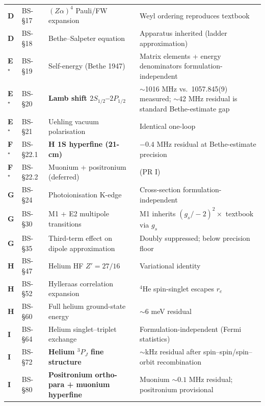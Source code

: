 \begin{center}
\begin{longtable}{lllp{5.5cm}}
\textbf{D} & BS-\S 17  & $(Z\alpha)^4$ Pauli/FW expansion           & Weyl ordering reproduces textbook \\
\textbf{D} & BS-\S 18  & Bethe--Salpeter equation                   & Apparatus inherited (ladder approximation) \\
\textbf{E}$^\star$ & BS-\S 19   & Self-energy (Bethe 1947)          & Matrix elements + energy denominators formulation-independent \\
\textbf{E}$^\star$ & BS-\S 20   & \textbf{Lamb shift $2S_{1/2}$--$2P_{1/2}$} & $\sim$1016 MHz vs.~1057.845(9) measured; $\sim$42 MHz residual is standard Bethe-estimate gap \\
\textbf{E}$^\star$ & BS-\S 21   & Uehling vacuum polarisation       & Identical one-loop \\
\textbf{F}$^\star$ & BS-\S 22.1 & \textbf{H 1S hyperfine (21-cm)}   & ${-}0.4$ MHz residual at Bethe-estimate precision \\
\textbf{F}$^\star$ & BS-\S 22.2 & Muonium + positronium (deferred)  & (PR I) \\
\textbf{G} & BS-\S 24  & Photoionisation K-edge                     & Cross-section formulation-independent \\
\textbf{G} & BS-\S 30  & M1 + E2 multipole transitions              & M1 inherits $(g_s/{-}2)^2 \times$ textbook via $g_s$ \\
\textbf{G} & BS-\S 35  & Third-term effect on dipole approximation  & Doubly suppressed; below precision floor \\
\textbf{H} & BS-\S 47  & Helium HF $Z' = 27/16$                     & Variational identity \\
\textbf{H} & BS-\S 52  & Hylleraas correlation expansion            & ${}^4$He spin-singlet escapes $r_e$ \\
\textbf{H} & BS-\S 60  & Full helium ground-state energy            & $\sim$6 meV residual \\
\textbf{I} & BS-\S 64  & Helium singlet--triplet exchange           & Formulation-independent (Fermi statistics) \\
\textbf{I} & BS-\S 72  & \textbf{Helium $^3P_J$ fine structure}     & $\sim$kHz residual after spin--spin/spin--orbit recombination \\
\textbf{I} & BS-\S 80  & \textbf{Positronium ortho-para + muonium hyperfine} & Muonium $\sim 0.1$ MHz residual; positronium provisional \\
\bottomrule
\end{longtable}
\end{center}

